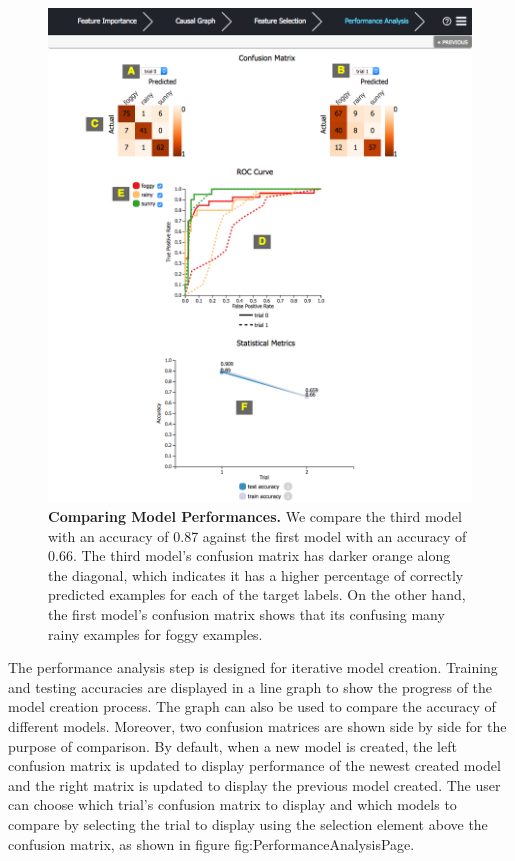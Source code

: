 \begin{figure}[!htbp]
\centering
\includegraphics[width=1\textwidth]{compareclassifierspageview}
\caption{\textbf{Comparing Model Performances.} We compare the third model with an accuracy of 0.87 against the first model with an accuracy of 0.66. The third model's confusion matrix has darker orange along the diagonal, which indicates it has a higher percentage of correctly predicted examples for each of the target labels. On the other hand, the first model's confusion matrix shows that its confusing many rainy examples for foggy examples. } \label{fig:PerformanceAnalysisPage}
\end{figure}

The performance analysis step is designed for iterative model creation. Training and testing accuracies are displayed in a line graph to show the progress of the model creation process. The graph can also be used to compare the accuracy of different models. Moreover, two confusion matrices are shown side by side for the purpose of comparison. By default, when a new model is created, the left confusion matrix is updated to display performance of the newest created model and the right matrix is updated to display the previous model created. The user can choose which trial's confusion matrix to display and which models to compare by selecting the trial to display using the selection element above the confusion matrix, as shown in figure  {fig:PerformanceAnalysisPage}.

